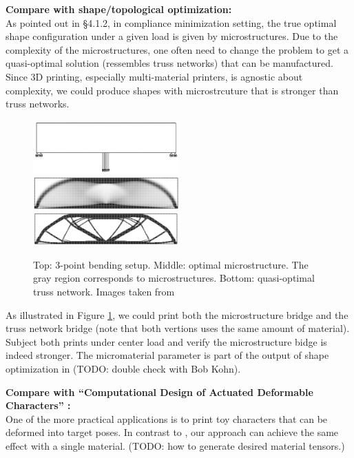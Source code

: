 \begin{description}
\item{\bf Compare with shape/topological optimization:}\\
As pointed out in \cite{allaire2002shape} \S 4.1.2, in compliance minimization
setting, the true optimal shape configuration under a given load is given by
microstructures.  Due to the complexity of the microstructures, one often need
to change the problem to get a quasi-optimal solution (ressembles truss
networks) that can be manufactured.  Since 3D printing, especially
multi-material printers, is agnostic about complexity, we could produce shapes
with microstrcuture that is stronger than truss networks.

\begin{figure}
\centering
\includegraphics[width=0.5\textwidth]{images/3pt_bending}\\
\includegraphics[width=0.5\textwidth]{images/micro_struct_bridge}\\
\includegraphics[width=0.5\textwidth]{images/truss_network_bridge}\\
\caption{Top: 3-point bending setup.  Middle: optimal microstructure.  The gray
region corresponds to microstructures.  Bottom:
quasi-optimal truss network.  Images taken from \cite{allaire1996homogenization}}
\label{fig:3pt_bending}
\end{figure}

As illustrated in Figure \ref{fig:3pt_bending}, we could print both the
microstructure bridge and the truss network bridge (note that both vertions uses
the same amount of material).  Subject both prints under center load and verify
the microstructure bidge is indeed stronger.  The micromaterial parameter is
part of the output of shape optimization in \cite{allaire1996homogenization}
(TODO: double check with Bob Kohn).

\item{\bf Compare with ``Computational Design of Actuated Deformable
Characters''
\cite{Skouras:2013}:}\\
One of the more practical applications is to print toy characters that can be
deformed into target poses.  In contrast to \cite{Skouras:2013}, our approach
can achieve the same effect with a single material.
(TODO: how to generate desired material tensors.)


\end{description}
